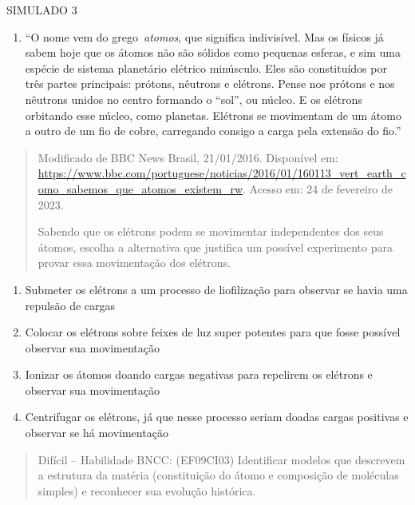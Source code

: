 SIMULADO 3

\begin{enumerate}
\def\labelenumi{\arabic{enumi})}
\item
  ``O nome vem do grego~\emph{atomos}, que significa indivisível. Mas os
  físicos já sabem hoje que os átomos não são sólidos como pequenas
  esferas, e sim uma espécie de sistema planetário elétrico minúsculo.
  Eles são constituídos por três partes principais: prótons, nêutrons e
  elétrons. Pense nos prótons e nos nêutrons unidos no centro formando o
  ``sol'', ou núcleo. E os elétrons orbitando esse núcleo, como
  planetas. Elétrons se movimentam de um átomo a outro de um fio de
  cobre, carregando consigo a carga pela extensão do fio.''
\end{enumerate}

\begin{quote}
Modificado de BBC News Brasil, 21/01/2016. Disponível em:
\url{https://www.bbc.com/portuguese/noticias/2016/01/160113_vert_earth_como_sabemos_que_atomos_existem_rw}.
Acesso em: 24 de fevereiro de 2023.

Sabendo que os elétrons podem se movimentar independentes dos seus
átomos, escolha a alternativa que justifica um possível experimento para
provar essa movimentação dos elétrons.
\end{quote}

\begin{enumerate}
\def\labelenumi{(\Alph{enumi})}
\item
  Submeter os elétrons a um processo de liofilização para observar se
  havia uma repulsão de cargas
\item
  Colocar os elétrons sobre feixes de luz super potentes para que fosse
  possível observar sua movimentação
\item
  Ionizar os átomos doando cargas negativas para repelirem os elétrons e
  observar sua movimentação
\item
  Centrifugar os elétrons, já que nesse processo seriam doadas cargas
  positivas e observar se há movimentação
\end{enumerate}

\begin{quote}
Difícil -- Habilidade BNCC: (EF09CI03) Identificar modelos que descrevem
a estrutura da matéria (constituição do átomo e composição de moléculas
simples) e reconhecer sua evolução histórica.
\end{quote}


